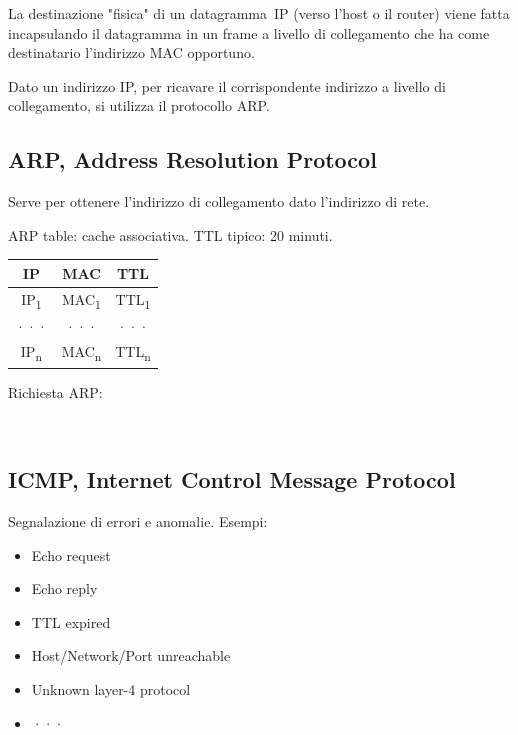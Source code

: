 \documentclass[12pt,a4paper]{article}
\begin{document}
La destinazione "fisica" di un datagramma~IP (verso l'host o il router)
viene fatta incapsulando il datagramma in un frame a livello di collegamento
che ha come destinatario l'indirizzo MAC opportuno.

Dato un indirizzo IP, per ricavare il corrispondente indirizzo a livello
di collegamento, si utilizza il protocollo ARP.

\subsection{ARP, Address Resolution Protocol}
Serve per ottenere l'indirizzo di collegamento dato l'indirizzo di rete.

ARP table: cache associativa. TTL tipico: 20 minuti.

\begin{table}[H]
\centering
\begin{tabular}{ c | c | c }
  IP                    & MAC                   & TTL                   \\ \hline
  IP\textsubscript{1}   & MAC\textsubscript{1}  & TTL\textsubscript{1}  \\
  ···               & ···               & ···               \\
  IP\textsubscript{n}   & MAC\textsubscript{n}  & TTL\textsubscript{n}  \\
\end{tabular}
\end{table}

Richiesta ARP:

\\

\subsection{ICMP, Internet Control Message Protocol}
Segnalazione di errori e anomalie. Esempi:
\begin{itemize}
  \item Echo request
  \item Echo reply
  \item TTL expired
  \item Host/Network/Port unreachable
  \item Unknown layer-4 protocol
  \item ···
\end{itemize}
\end{document}
